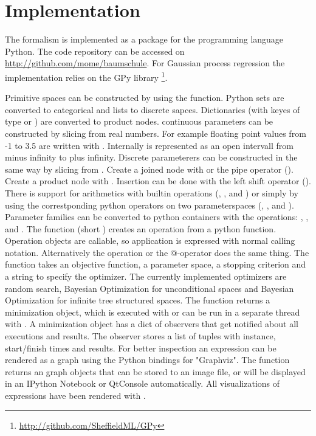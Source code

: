 \documentclass[english]{article}
\begin{document}
\section{Implementation}
The formalism is implemented as a package for the programming language Python. The code repository can be accessed on \url{http://github.com/mome/baumschule}. For Gaussian process regression the implementation relies on the GPy library \footnote{\url{http://github.com/SheffieldML/GPy}}.

Primitive spaces can be constructed by using the  function. Python sets are converted to categorical and lists to discrete sapces. Dictionaries (with keyes of type  or ) are converted to product nodes. continuous parameters can be constructed by slicing from real numbers. For example floating point values from -1 to 3.5 are written with . Internally  is represented as an open intervall from minus infinity to plus infinity. Discrete parameterers can be constructed in the same way by slicing from . Create a joined node with  or the pipe operator (\python{|}). Create a product node with . Insertion can be done with the left shift operator (\python{<<}). There is support for arithmetics with builtin operations (, ,  and ) or simply by using the correstponding python operators on two parameterspaces (\python{+}, \python{-}, \python{*} and \python{/}). Parameter families can be converted to python containers with the operations: , ,  and .
The  function (short ) creates an operation from a python function. Operation objects are callable, so application is expressed with normal calling notation. Alternatively the  operation or the @-operator does the same thing. The  function takes an objective function, a parameter space, a stopping criterion and a string to specify the optimizer.  The currently implemented optimizers are random search, Bayesian Optimization for unconditional spaces and Bayesian Optimization for infinite tree structured spaces. The  function returns a minimization object, which is executed with  or can be run in a separate thread with . A minimization object has a dict of observers that get notified about all executions and results. The  observer stores a list of tuples with instance, start/finish times and results.
For better inspection an expression can be rendered as a graph using the Python bindings for "Graphviz". The  function returns an graph objects that can be stored to an image file, or will be displayed in an IPython Notebook or QtConsole automatically. All visualizations of expressions have been rendered with .
\end{document}
